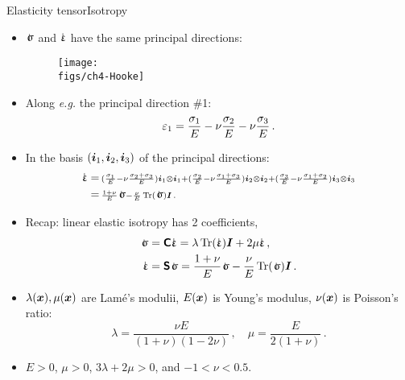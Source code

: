 \begin{frame}{Elasticity tensor}{Isotropy}
\begin{overprint}
\begin{itemize}
\item $\stress$ and $\strain$ have the same principal directions:
\begin{figure}
\centering\texttt{[image: \\figs/ch4-Hooke]}
\end{figure}
\item Along \emph{e.g.} the principal direction \#1:
\begin{displaymath}
\varepsilon_1=\frac{\sigma_1}{E}-\nu\frac{\sigma_2}{E}-\nu\frac{\sigma_3}{E}\,.
\end{displaymath}
\item In the basis $({\boldsymbol{i}}_1,{\boldsymbol{i}}_2,{\boldsymbol{i}}_3)$ of the principal directions:
\begin{displaymath}
\begin{split}
\strain &=\, \scriptstyle (\frac{\stressj_1}{E}-\nu\frac{\stressj_2+\stressj_3}{E}) \iv_1\otimes\iv_1 + (\frac{\stressj_2}{E}-\nu\frac{\stressj_1+\stressj_3}{E}) \iv_2\otimes\iv_2 + (\frac{\stressj_3}{E}-\nu\frac{\stressj_1+\stressj_2}{E}) \iv_3\otimes\iv_3 \\
&=\, \scriptstyle \frac{1+\nu}{E}\stress-\frac{\nu}{E}\trace(\stress)\Id\,.
\end{split}
\end{displaymath}
\end{itemize}

\begin{itemize}
\item Recap: linear elastic isotropy has 2 coefficients,
\begin{displaymath}
\begin{split}
\stress &=\tenselas\strain=\lambda\trace(\strain)\Id+2\mu\strain\,, \\
\strain &=\tenscomp\stress=\frac{1+\nu}{E}\stress-\frac{\nu}{E}\trace(\stress)\Id\,.
\end{split}
\end{displaymath}
\item $\lambda({\boldsymbol{x}}),\mu({\boldsymbol{x}})$ are Lam\'e's modulii, $E({\boldsymbol{x}})$ is Young's modulus, $\nu({\boldsymbol{x}})$ is Poisson's ratio:
\begin{displaymath}
\lambda=\frac{\nu E}{(1+\nu)(1-2\nu)}\,,\quad\mu=\frac{E}{2(1+\nu)}\,.
\end{displaymath}
\item $E>0$, $\mu>0$, $3\lambda+2\mu>0$, and $-1<\nu<0.5$.
\end{itemize}

\end{overprint}

\end{frame}

